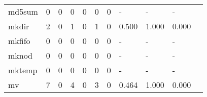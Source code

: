 \begin{longtable}{lp{1.2cm}p{1.2cm}p{1.2cm}p{1.2cm}p{1.2cm}p{1.2cm}p{1.2cm}p{1.2cm}p{1.2cm}p{1.2cm}}
md5sum    &                                     0 &                                                  0 &                                                0 &                                               0 &                                                0 &                                              0 &                                             - &                                                  - &                                                  - \\
mkdir     &                                     2 &                                                  0 &                                                1 &                                               0 &                                                1 &                                              0 &                                         0.500 &                                              1.000 &                                              0.000 \\
mkfifo    &                                     0 &                                                  0 &                                                0 &                                               0 &                                                0 &                                              0 &                                             - &                                                  - &                                                  - \\
mknod     &                                     0 &                                                  0 &                                                0 &                                               0 &                                                0 &                                              0 &                                             - &                                                  - &                                                  - \\
mktemp    &                                     0 &                                                  0 &                                                0 &                                               0 &                                                0 &                                              0 &                                             - &                                                  - &                                                  - \\
mv        &                                     7 &                                                  0 &                                                4 &                                               0 &                                                3 &                                              0 &                                         0.464 &                                              1.000 &                                              0.000 \\

\end{longtable}
